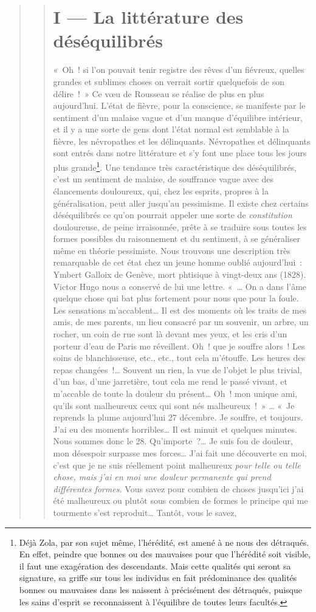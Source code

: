 \documentclass[french,twoside]{book} %
\begin{document}
\begin{verse}
\begin{verse}
\section[{I — La littérature des déséquilibrés}]{I — La littérature des déséquilibrés}
\noindent « Oh ! si l’on pouvait tenir registre des rêves d’un fiévreux, quelles grandes et sublimes choses on verrait sortir quelquefois de son délire ! » Ce vœu de Rousseau se réalise de plus en plus aujourd’hui. L’état de fièvre, pour la conscience, se manifeste par le sentiment d’un malaise vague et d’un manque d’équilibre intérieur, et il y a une sorte de gens dont l’état normal est semblable à la fièvre, les névropathes et les délinquants. Névropathes et délinquants sont entrés dans notre littérature et s’y font une place tous les jours plus grande\footnote{ Déjà Zola, par son sujet même, l’hérédité, est amené à ne nous des détraqués. En effet, peindre que bonnes ou des mauvaises pour que l’hérédité soit visible, il faut une exagération des descendants. Mais cette qualités qui seront sa signature, sa griffe sur tous les individus en fait prédominance des qualités bonnes ou mauvaises dans les naissent à précisément des détraqués, puisque les sains d’esprit se reconnaissent à l’équilibre de toutes leurs facultés.}. Une tendance très caractéristique des déséquilibrés, c’est un sentiment de malaise, de souffrance vague avec des élancements douloureux, qui, chez les esprits, propres à la généralisation, peut aller jusqu’au pessimisme. Il existe chez certains déséquilibrés ce qu’on pourrait appeler une sorte de \emph{constitution} douloureuse, de peine irraisonnée, prête à se traduire sous toutes les formes possibles du raisonnement et du sentiment, à se généraliser même en théorie pessimiste. Nous trouvons une description très remarquable de cet état chez un jeune homme oublié aujourd’hui : Ymbert Galloix de Genève, mort phtisique à vingt-deux ans (1828). Victor Hugo nous a conservé de lui une lettre. « … On a dans l’âme quelque chose qui bat plus fortement pour nous que pour la foule. Les sensations m’accablent… Il est des moments où les traits de mes amis, de mes parents, un lieu consacré par un souvenir, un arbre, un rocher, un coin de rue sont là devant mes yeux, et les cris d’un porteur d’eau de Paris me réveillent. Oh ! que je souffre alors ! Les soins de blanchisseuse, etc., etc., tout cela m’étouffe. Les heures des repas changées !… Souvent un rien, la vue de l’objet le plus trivial, d’un bas, d’une jarretière, tout cela me rend le passé vivant, et m’accable de toute la douleur du présent… Oh ! mon unique ami, qu’ils sont malheureux ceux qui sont nés malheureux ! » … « Je reprends la plume aujourd’hui 27 décembre. Je souffre, et toujours. J’ai eu des moments horribles… Il est minuit et quelques minutes. Nous sommes donc le 28. Qu’importe ?… Je suis fou de douleur, mon désespoir surpasse mes forces… J’ai fait une découverte en moi, c’est que je ne suis réellement point malheureux \emph{pour telle ou telle chose, mais j’ai en moi une douleur permanente qui prend différentes formes.} Vous savez pour combien de choses jusqu’ici j’ai été malheureux ou plutôt sous combien de formes le principe qui me tourmente s’est reproduit… Tantôt, vous le savez, 
\end{verse}
\end{verse}
\end{document}
